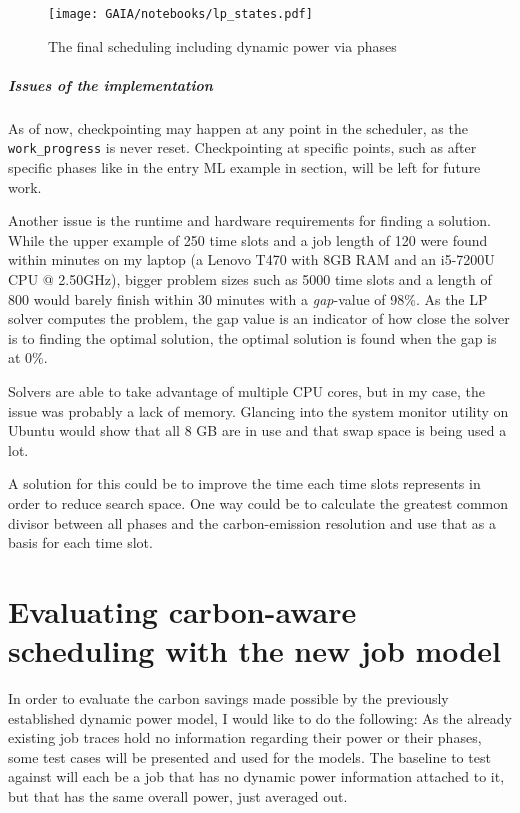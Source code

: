 \begin{figure}
    \texttt{[image: GAIA/notebooks/lp\_states.pdf]}
    \caption{The final scheduling including dynamic power via phases}
    \label{fig:lp_states}
\end{figure}

\subparagraph{Issues of the implementation}

As of now, checkpointing may happen at any point in the scheduler, as the \verb|work_progress| is never reset. 
Checkpointing at specific points, such as after specific phases like in the entry ML example in section, will be left for future work.

Another issue is the runtime and hardware requirements for finding a solution.
While the upper example of 250 time slots and a job length of 120 were found within minutes on my laptop (a Lenovo T470 with 8GB RAM and an i5-7200U CPU @ 2.50GHz), bigger problem sizes such as 5000 time slots and a length of 800 would barely finish within 30 minutes with a \emph{gap}-value of 98\%.
As the LP solver computes the problem, the gap value is an indicator of how close the solver is to finding the optimal solution, the optimal solution is found when the gap is at 0\%.

Solvers are able to take advantage of multiple CPU cores, but in my case, the issue was probably a lack of memory. 
Glancing into the system monitor utility on Ubuntu would show that all 8 GB are in use and that swap space is being used a lot.

A solution for this could be to improve the time each time slots represents in order to reduce search space.
One way could be to calculate the greatest common divisor between all phases and the carbon-emission resolution and use that as a basis for each time slot.



\section{Evaluating carbon-aware scheduling with the new job model} \label{sec:evaluate_scheduling}

In order to evaluate the carbon savings made possible by the previously established dynamic power model, I would like to do the following:
As the already existing job traces hold no information regarding their power or their phases, some test cases will be presented and used for the models.
The baseline to test against will each be a job that has no dynamic power information attached to it, but that has the same overall power, just averaged out.

